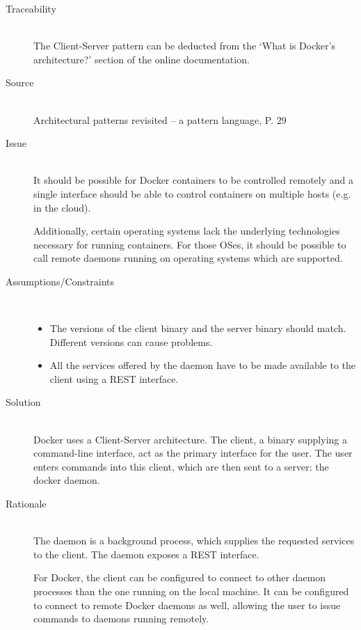 \begin{description}
\item [Traceability]~\\
The Client-Server pattern can be deducted from the `What is Docker’s architecture?' section of the online documentation\cite{dockerarchi}.

\item [Source]~\\
Architectural patterns revisited -- a pattern language, P. 29 \cite{avgeriou2005architectural}

\item [Issue]~\\
It should be possible for Docker containers to be controlled remotely and a single interface should be able to control containers on multiple hosts (e.g. in the cloud).

Additionally, certain operating systems lack the underlying technologies necessary for running containers. For those OSes, it should be possible to call remote daemons running on operating systems which are supported. %

\item [Assumptions/Constraints]~
\begin{itemize}
\item The versions of the client binary and the server binary should match. Different versions can cause problems.
\item All the services offered by the daemon have to be made available to the client using a REST interface.
\end{itemize}

\item [Solution]~\\
Docker uses a Client-Server architecture. The client, a binary supplying a command-line interface, act as the primary interface for the user. The user enters commands into this client, which are then sent to a server: the docker daemon. 

\item [Rationale] ~\\
The daemon is a background process, which supplies the requested services to the client. The daemon exposes a REST interface.

For Docker, the client can be configured to connect to other daemon processes than the one running on the local machine. It can be configured to connect to remote Docker daemons as well, allowing the user to issue commands to daemons running remotely.


\end{description}
